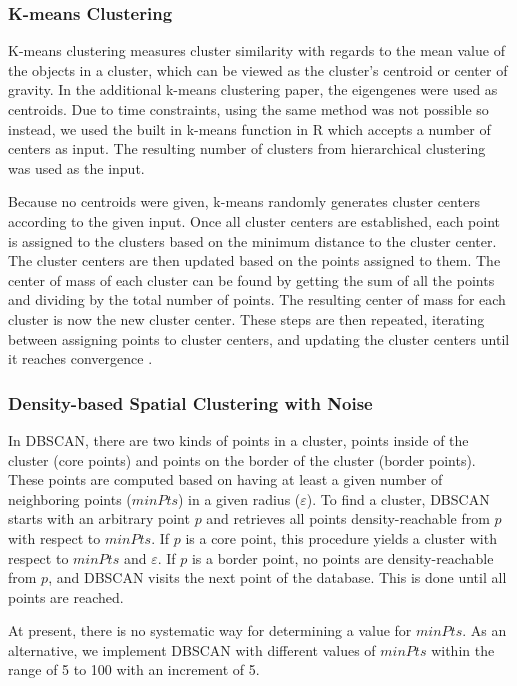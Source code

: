 \documentclass[sigconf,authordraft]{acmart}
\begin{document}
\subsubsection{K-means Clustering}
K-means clustering measures cluster similarity with regards to the mean value of the objects in a cluster, which can be viewed as the cluster's centroid or center of gravity. In the additional k-means clustering paper, the eigengenes were used as centroids. Due to time constraints, using the same method was not possible so instead, we used the built in k-means function in R \cite{RLanguageEnvironment} which accepts a number of centers as input. The resulting number of clusters from hierarchical clustering was used as the input.

Because no centroids were given, k-means randomly generates cluster centers according to the given input. Once all cluster centers are established, each point is assigned to the clusters based on the minimum distance to the cluster center. The cluster centers are then updated based on the points assigned to them. The center of mass of each cluster can be found by getting the sum of all the points and dividing by the total number of points. The resulting center of mass for each cluster is now the new cluster center. These steps are then repeated, iterating between assigning points to cluster centers, and updating the cluster centers until it reaches convergence \cite{AliKadhum2017}.

\subsubsection{Density-based Spatial Clustering with Noise}
In DBSCAN, there are two kinds of points in a cluster, points inside of the cluster (core points) and points on the border of the cluster (border points). These points are computed based on having at least a given number of neighboring points ($minPts$) in a given radius ($\varepsilon$). To find a cluster, DBSCAN starts with an arbitrary point $p$ and retrieves all points density-reachable from $p$ with respect to $minPts$. If $p$ is a core point, this procedure yields a cluster with respect to $minPts$ and $\varepsilon$. If $p$ is a border point, no points are density-reachable from $p$, and DBSCAN visits the next point of the database. This is done until all points are reached. 

At present, there is no systematic way for determining a value for $minPts$. As an alternative, we implement DBSCAN with different values of $minPts$ within the range of 5 to 100 with an increment of 5.
\end{document}
